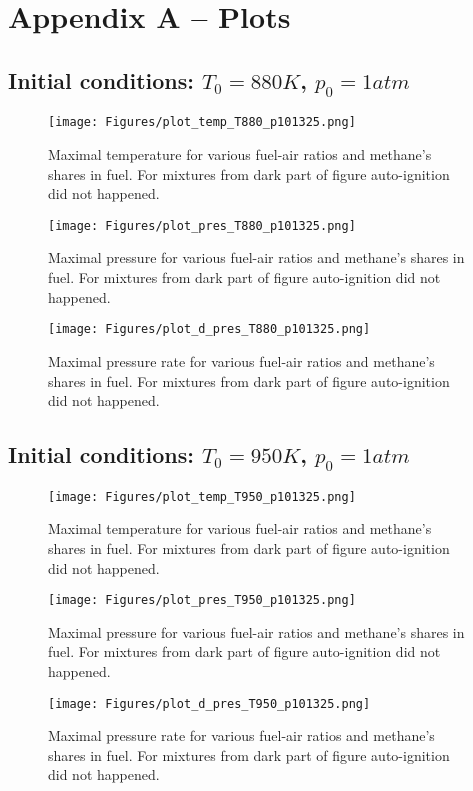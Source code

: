 \newpage
\section{Appendix A – Plots}
\label{AppA}


\subsection{Initial conditions: $T_0=880K$, $p_0=1atm$}
\begin{figure}[H]
	\centering
	\texttt{[image: Figures/plot\_temp\_T880\_p101325.png]}
	\caption{Maximal temperature for various fuel-air ratios and methane's shares in fuel. For mixtures from dark part of figure auto-ignition did not happened.}
	\label{fig:T880p1_temp}
\end{figure}
\begin{figure}[H]
	\centering
	\texttt{[image: Figures/plot\_pres\_T880\_p101325.png]}
	\caption{Maximal pressure for various fuel-air ratios and methane's shares in fuel. For mixtures from dark part of figure auto-ignition did not happened.}
	\label{fig:T880p1_pres}
\end{figure}
\begin{figure}[H]
	\centering
	\texttt{[image: Figures/plot\_d\_pres\_T880\_p101325.png]}
	\caption{Maximal pressure rate for various fuel-air ratios and methane's shares in fuel. For mixtures from dark part of figure auto-ignition did not happened.}
	\label{fig:T880p1_rate}
\end{figure}

\subsection{Initial conditions: $T_0=950K$, $p_0=1atm$}
\begin{figure}[H]
	\centering
	\texttt{[image: Figures/plot\_temp\_T950\_p101325.png]}
	\caption{Maximal temperature for various fuel-air ratios and methane's shares in fuel. For mixtures from dark part of figure auto-ignition did not happened.}
	\label{fig:T950p1_temp}
\end{figure}
\begin{figure}[H]
	\centering
	\texttt{[image: Figures/plot\_pres\_T950\_p101325.png]}
	\caption{Maximal pressure for various fuel-air ratios and methane's shares in fuel. For mixtures from dark part of figure auto-ignition did not happened.}
	\label{fig:T950p1_pres}
\end{figure}
\begin{figure}[H]
	\centering
	\texttt{[image: Figures/plot\_d\_pres\_T950\_p101325.png]}
	\caption{Maximal pressure rate for various fuel-air ratios and methane's shares in fuel. For mixtures from dark part of figure auto-ignition did not happened.}
	\label{fig:T950p1_rate}
\end{figure}

